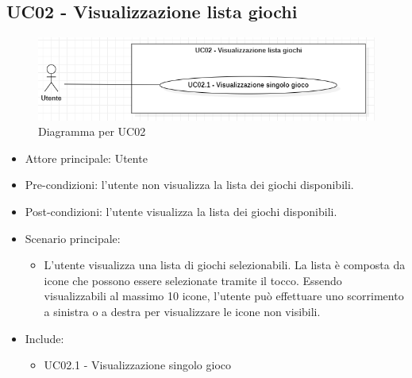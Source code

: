 \subsection{UC02 - Visualizzazione lista giochi}
\begin{figure}[h]
    \centering
    \includegraphics[width=400pt]{images/usecase/UC02.png}
    \caption{Diagramma per UC02}
    \label{fig:attore}
\end{figure}
\begin{itemize}
    \item Attore principale: Utente
    \item Pre-condizioni: l'utente non visualizza la lista dei giochi disponibili.
    \item Post-condizioni: l'utente visualizza la lista dei giochi disponibili.
    \item Scenario principale: \begin{itemize}
        \item L'utente visualizza una lista di giochi selezionabili. La lista è composta da icone che possono essere selezionate tramite il tocco. Essendo visualizzabili al massimo 10 icone, l'utente può effettuare uno scorrimento a sinistra o a destra per visualizzare le icone non visibili.
    \end{itemize}
    \item Include: \begin{itemize}
        \item UC02.1 - Visualizzazione singolo gioco
    \end{itemize}
\end{itemize}
\newpage
